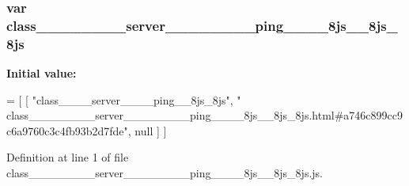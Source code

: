 \subsubsection[{class\+\_\+\+\_\+\+\_\+\+\_\+\+\_\+\+\_\+\+\_\+\+\_\+server\+\_\+\+\_\+\+\_\+\+\_\+\+\_\+\+\_\+\+\_\+\+\_\+ping\+\_\+\+\_\+\+\_\+\+\_\+8js\+\_\+\+\_\+8js\+\_\+8js}]{\setlength{\rightskip}{0pt plus 5cm}var class\+\_\+\+\_\+\+\_\+\+\_\+\+\_\+\+\_\+\+\_\+\+\_\+server\+\_\+\+\_\+\+\_\+\+\_\+\+\_\+\+\_\+\+\_\+\+\_\+ping\+\_\+\+\_\+\+\_\+\+\_\+8js\+\_\+\+\_\+8js\+\_\+8js}\label{class________________server________________ping________8js____8js__8js_8js_ab67b3cd6596abc75c3eb1f64720a8f91}
{\bfseries Initial value\+:}
\begin{DoxyCode}
=
[
    [ \textcolor{stringliteral}{"class\_\_\_\_server\_\_\_\_ping\_\_8js\_8js"}, \textcolor{stringliteral}{"
      class\_\_\_\_\_\_\_\_server\_\_\_\_\_\_\_\_ping\_\_\_\_8js\_\_8js\_8js.html#a746c899cc9c6a9760c3c4fb93b2d7fde"}, null ]
]
\end{DoxyCode}


Definition at line 1 of file class\+\_\+\+\_\+\+\_\+\+\_\+\+\_\+\+\_\+\+\_\+\+\_\+server\+\_\+\+\_\+\+\_\+\+\_\+\+\_\+\+\_\+\+\_\+\+\_\+ping\+\_\+\+\_\+\+\_\+\+\_\+8js\+\_\+\+\_\+8js\+\_\+8js.\+js.

